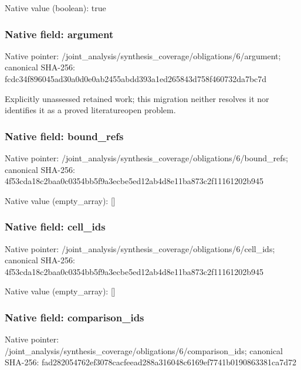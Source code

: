 \documentclass[10pt,a4paper]{article}
\begin{document}
Native value (boolean): true



\subsubsection{Native field: argument}


Native pointer: /joint\_analysis/synthesi\allowbreak{}s\_coverage/obligations/6\allowbreak{}/argument; canonical SHA-256: fcdc34f896045ad30a0d0e0a\allowbreak{}b2455abdd393a1ed265843d7\allowbreak{}58f460732da7bc7d


Explicitly unassessed retained work; this migration neither resolves it nor identifies it as a proved literatureopen problem.


\subsubsection{Native field: bound\_refs}


Native pointer: /joint\_analysis/synthesi\allowbreak{}s\_coverage/obligations/6\allowbreak{}/bound\_refs; canonical SHA-256: 4f53cda18c2baa0c0354bb5f\allowbreak{}9a3ecbe5ed12ab4d8e11ba87\allowbreak{}3c2f11161202b945



Native value (empty\_array): []



\subsubsection{Native field: cell\_ids}


Native pointer: /joint\_analysis/synthesi\allowbreak{}s\_coverage/obligations/6\allowbreak{}/cell\_ids; canonical SHA-256: 4f53cda18c2baa0c0354bb5f\allowbreak{}9a3ecbe5ed12ab4d8e11ba87\allowbreak{}3c2f11161202b945



Native value (empty\_array): []



\subsubsection{Native field: comparison\_ids}


Native pointer: /joint\_analysis/synthesi\allowbreak{}s\_coverage/obligations/6\allowbreak{}/comparison\_ids; canonical SHA-256: fad282054762ef3078cacfee\allowbreak{}ad288a316048c6169ef7741b\allowbreak{}0190863381ca7d72
\end{document}
